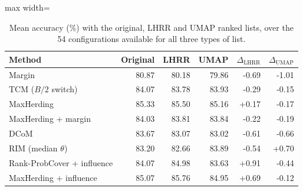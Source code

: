 \begin{table}[t]
\centering
\caption{Mean accuracy (\%) with the original, LHRR and UMAP ranked lists, over the 54 configurations available for all three types of list.}
\label{tab:rerank}
\footnotesize
\begin{adjustbox}{max width=\columnwidth}
\begin{tabular}{lrrrrr}
\toprule
Method & Original & LHRR & UMAP & $\Delta_{\mathrm{LHRR}}$ & $\Delta_{\mathrm{UMAP}}$ \\
\midrule
Margin~\cite{scheffer2001active} & 80.87 & 80.18 & 79.86 & -0.69 & -1.01 \\
TCM ($B/2$ switch)~\cite{doucet2024bridging} & 84.07 & 83.78 & 83.93 & -0.29 & -0.15 \\
MaxHerding~\cite{bae2024generalized} & 85.33 & 85.50 & 85.16 & +0.17 & -0.17 \\
MaxHerding + margin & 84.03 & 83.81 & 83.84 & -0.22 & -0.19 \\
DCoM~\cite{mishal2024dcom} & 83.67 & 83.07 & 83.02 & -0.61 & -0.66 \\
RIM (median $\theta$)~\cite{zhang2021rim} & 83.20 & 82.66 & 83.89 & -0.54 & +0.70 \\
Rank-ProbCover + influence & 84.07 & 84.98 & 83.63 & +0.91 & -0.44 \\
MaxHerding + influence & 85.07 & 85.76 & 84.95 & +0.69 & -0.12 \\
\bottomrule
\end{tabular}
\end{adjustbox}
\end{table}

